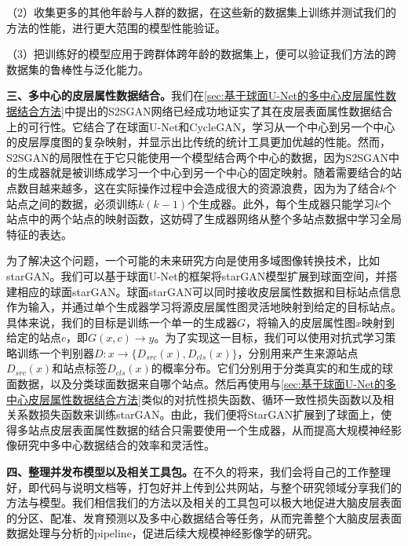（2）收集更多的其他年龄与人群的数据，在这些新的数据集上训练并测试我们的方法的性能，进行更大范围的模型性能验证。

（3）把训练好的模型应用于跨群体跨年龄的数据集上，便可以验证我们方法的跨数据集的鲁棒性与泛化能力。

\textbf{三、多中心的皮层属性数据结合。}我们在\ref{sec:基于球面U-Net的多中心皮层属性数据结合方法}中提出的S2SGAN网络已经成功地证实了其在皮层表面属性数据结合上的可行性。它结合了在球面U-Net和CycleGAN，学习从一个中心到另一个中心的皮层厚度图的复杂映射，并显示出比传统的统计工具更加优越的性能。然而，S2SGAN的局限性在于它只能使用一个模型结合两个中心的数据，因为S2SGAN中的生成器就是被训练成学习一个中心到另一个中心的固定映射。随着需要结合的站点数目越来越多，这在实际操作过程中会造成很大的资源浪费，因为为了结合$k$个站点之间的数据，必须训练$k(k-1)$个生成器。此外，每个生成器只能学习$k$个站点中的两个站点的映射函数，这妨碍了生成器网络从整个多站点数据中学习全局特征的表达。

为了解决这个问题，一个可能的未来研究方向是使用多域图像转换技术，比如starGAN\cite{choi2018stargan}。我们可以基于球面U-Net的框架将starGAN模型扩展到球面空间，并搭建相应的球面starGAN。球面starGAN可以同时接收皮层属性数据和目标站点信息作为输入，并通过单个生成器学习将源皮层属性图灵活地映射到给定的目标站点。具体来说，我们的目标是训练一个单一的生成器$G$，将输入的皮层属性图$x$映射到给定的站点$c$，即$G(x,c)\rightarrow y$。为了实现这一目标，我们可以使用对抗式学习策略\cite{goodfellow2014generative}训练一个判别器$D:x\rightarrow \{D_{src}(x),D_{cls}(x)\}$，分别用来产生来源站点$D_{src}(x)$和站点标签$D_{cls}(x)$的概率分布。它们分别用于分类真实的和生成的球面数据，以及分类球面数据来自哪个站点。然后再使用与\ref{sec:基于球面U-Net的多中心皮层属性数据结合方法}类似的对抗性损失函数、循环一致性损失函数以及相关系数损失函数来训练starGAN。由此，我们便将StarGAN扩展到了球面上，使得多站点皮层表面属性数据的结合只需要使用一个生成器，从而提高大规模神经影像研究中多中心数据结合的效率和灵活性。

\textbf{四、整理并发布模型以及相关工具包。}在不久的将来，我们会将自己的工作整理好，即代码与说明文档等，打包好并上传到公共网站，与整个研究领域分享我们的方法与模型。我们相信我们的方法以及相关的工具包可以极大地促进大脑皮层表面的分区、配准、发育预测以及多中心数据结合等任务，从而完善整个大脑皮层表面数据处理与分析的pipeline，促进后续大规模神经影像学的研究。